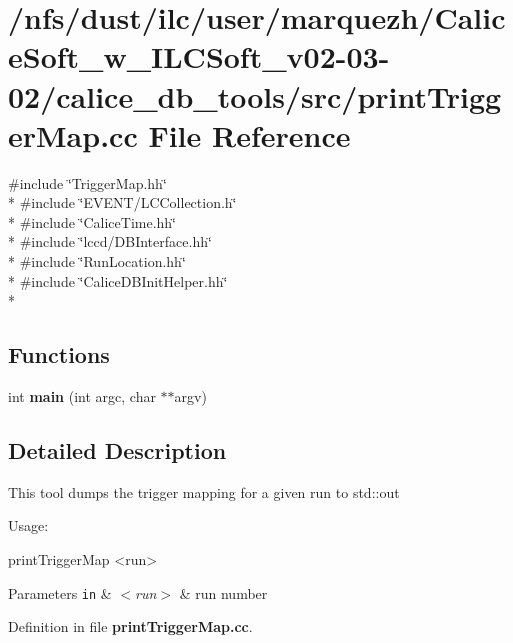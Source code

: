 \section{/nfs/dust/ilc/user/marquezh/\-Calice\-Soft\-\_\-w\-\_\-\-I\-L\-C\-Soft\-\_\-v02-\/03-\/02/calice\-\_\-db\-\_\-tools/src/print\-Trigger\-Map.cc File Reference}
\label{printTriggerMap_8cc}
{\ttfamily \#include \char`\"{}Trigger\-Map.\-hh\char`\"{}}\\*
{\ttfamily \#include \char`\"{}E\-V\-E\-N\-T/\-L\-C\-Collection.\-h\char`\"{}}\\*
{\ttfamily \#include \char`\"{}Calice\-Time.\-hh\char`\"{}}\\*
{\ttfamily \#include \char`\"{}lccd/\-D\-B\-Interface.\-hh\char`\"{}}\\*
{\ttfamily \#include \char`\"{}Run\-Location.\-hh\char`\"{}}\\*
{\ttfamily \#include \char`\"{}Calice\-D\-B\-Init\-Helper.\-hh\char`\"{}}\\*
\subsection*{Functions}
\begin{DoxyCompactItemize}
\item 
int {\bfseries main} (int argc, char $\ast$$\ast$argv)\label{printTriggerMap_8cc_a3c04138a5bfe5d72780bb7e82a18e627}

\end{DoxyCompactItemize}


\subsection{Detailed Description}
This tool dumps the trigger mapping for a given run to std\-::out

Usage\-:


\begin{DoxyCode}
printTriggerMap <run>
\end{DoxyCode}



\begin{DoxyParams}[1]{Parameters}
\mbox{\tt in}  & {\em $<$run$>$} & run number \\
\hline
\end{DoxyParams}


Definition in file {\bf print\-Trigger\-Map.\-cc}.

